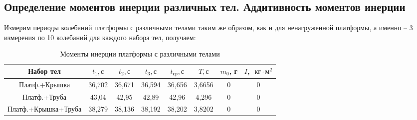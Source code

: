 \documentclass[a4paper,12pt]{article}
\begin{document}
\subsection*{Определение моментов инерции различных тел. Аддитивность моментов инерции}
    Измерим периоды колебаний платформы с различными телами таким же образом, как и для ненагруженной платформы, а именно -- 3 измерения по 10 колебаний для каждого набора тел, получаем:
	\begin{table}[H]
        \begin{center}
            \begin{tabular}{|c|c|c|c|c|c|c|c|}
                \hline 
                Набор тел & $t_1, с$ & $t_2, с$ & $t_3, с$ & $t_\text{ср}, с$ & $T, с$ & $m_0$, г & $I$, $\text{ кг} \cdot \text{м}^2$\\
                \hline
                Платф.+Крышка & 36,702 & 36,671 & 36,594 &  36,656  & 3,6656 & 0 & 0\\
                \hline 
                Платф.+Труба & 43,04 & 42,95 & 42,89 & 42,96 & 4,296 & 0 & 0\\
                \hline 
                Платф.+Крышка+Труба & 38,279 & 38,136 & 38,192 & 38,202 & 3,8202 & 0 & 0\\
                \hline 
            \end{tabular}
            \caption{Моменты инерции платформы с различными телами}
        \end{center}
    \end{table} 
    

     
\end{document}
